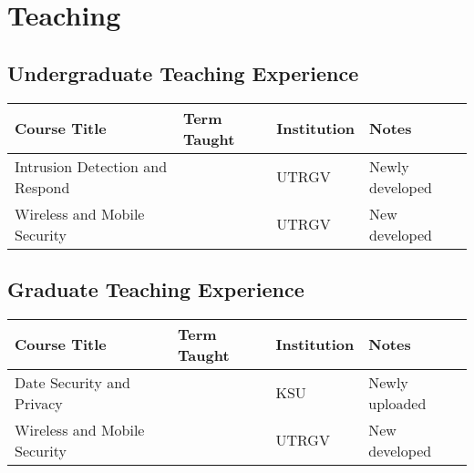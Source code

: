 
\section*{Teaching}

\subsection*{Undergraduate Teaching Experience}

\begin{longtable}{|p{2in}|p{1in}|p{0.8in}|p{2in}|}
    \hline
    \rowcolor{lightgray}
    \textbf{Course Title} &   \textbf{Term Taught}   &   \textbf{Institution}    & \textbf{Notes}\\
    \hline
    Intrusion Detection and Respond &   & UTRGV &   Newly developed\\
    \hline
    Wireless and Mobile Security    &   &   UTRGV   &   New developed\\
    \hline
\end{longtable}

\subsection*{Graduate Teaching Experience}

\begin{longtable}{|p{2in}|p{1in}|p{0.8in}|p{2in}|}
    \hline
    \rowcolor{lightgray}
    \textbf{Course Title} &   \textbf{Term Taught}   &   \textbf{Institution}    & \textbf{Notes}\\
    \hline
    Date Security and Privacy &   & KSU &   Newly uploaded\\
    \hline
    Wireless and Mobile Security    &   &   UTRGV   &   New developed\\
    \hline
\end{longtable}

